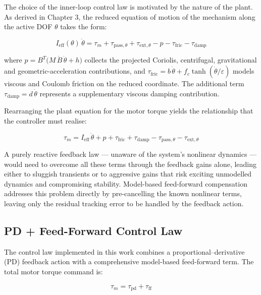 The choice of the inner-loop control law is motivated by the nature of the plant. As derived in Chapter 3, the reduced equation of motion of the mechanism along the active DOF $\theta$ takes the form:

\begin{equation}
    I_{\mathrm{eff}}(\theta)\,\ddot\theta
  = \tau_m + \tau_{\mathrm{pass},\theta} + \tau_{\mathrm{ext},\theta}
    - p - \tau_{\mathrm{fric}} - \tau_{\mathrm{damp}}
\end{equation}

where $p = B^T\!\bigl(M\,\dot B\,\dot\theta + h\bigr)$ collects the projected Coriolis, centrifugal, gravitational and geometric-acceleration contributions, and $\tau_{\mathrm{fric}} = b\,\dot\theta + f_c\tanh(\dot\theta/\varepsilon)$ models viscous and Coulomb friction on the reduced coordinate. The additional term $\tau_{\mathrm{damp}} = d\,\dot\theta$ represents a supplementary viscous damping contribution.

Rearranging the plant equation for the motor torque yields the relationship that the controller must realise:

\begin{equation}
    \tau_m = I_{\mathrm{eff}}\,\ddot\theta + p + \tau_{\mathrm{fric}} + \tau_{\mathrm{damp}}
         - \tau_{\mathrm{pass},\theta} - \tau_{\mathrm{ext},\theta}
\end{equation}

A purely reactive feedback law — unaware of the system's nonlinear dynamics — would need to overcome all these terms through the feedback gains alone, leading either to sluggish transients or to aggressive gains that risk exciting unmodelled dynamics and compromising stability. Model-based feed-forward compensation addresses this problem directly by pre-cancelling the known nonlinear terms, leaving only the residual tracking error to be handled by the feedback action.

\subsection{PD + Feed-Forward Control Law}
The control law implemented in this work combines a proportional–derivative (PD) feedback action with a comprehensive model-based feed-forward term. The total motor torque command is:

\begin{equation}
    \tau_m = \tau_{\mathrm{pd}} + \tau_{\mathrm{ff}}
\end{equation}

